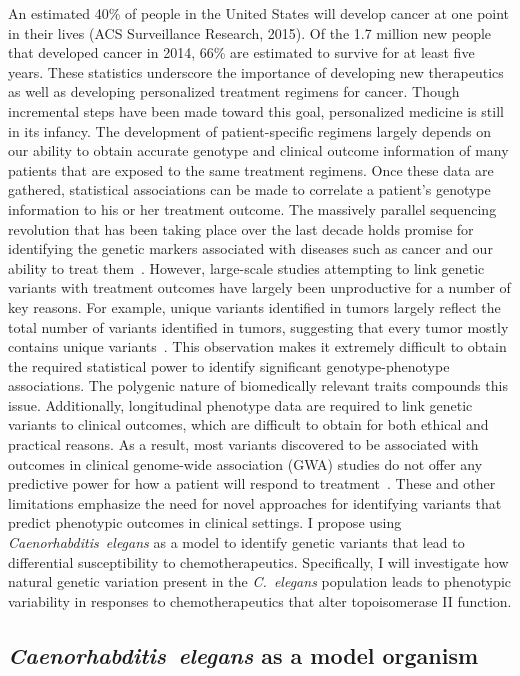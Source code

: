 \documentclass[12pt]{article}
\begin{document}
An estimated 40\% of people in the United States will develop cancer at one point in their lives (ACS Surveillance Research, 2015). Of the 1.7 million new people that developed cancer in 2014, 66\% are estimated to survive for at least five years. These statistics underscore the importance of developing new therapeutics as well as developing personalized treatment regimens for cancer. Though incremental steps have been made toward this goal, personalized medicine is still in its infancy. The development of patient-specific regimens largely depends on our ability to obtain accurate genotype and clinical outcome information of many patients that are exposed to the same treatment regimens. Once these data are gathered, statistical associations can be made to correlate a patient's genotype information to his or her treatment outcome. The massively parallel sequencing revolution that has been taking place over the last decade holds promise for identifying the genetic markers associated with diseases such as cancer and our ability to treat them~\cite{Koboldt:2013kw}. However, large-scale studies attempting to link genetic variants with treatment outcomes have largely been unproductive for a number of key reasons. For example, unique variants identified in tumors largely reflect the total number of variants identified in tumors, suggesting that every tumor mostly contains unique variants~\cite{Koboldt:2013kw}. This observation makes it extremely difficult to obtain the required statistical power to identify significant genotype-phenotype associations. The polygenic nature of biomedically relevant traits compounds this issue. Additionally, longitudinal phenotype data are required to link genetic variants to clinical outcomes, which are difficult to obtain for both ethical and practical reasons. As a result, most variants discovered to be associated with outcomes in clinical genome-wide association (GWA) studies do not offer any predictive power for how a patient will respond to treatment~\cite{Park:2012bz}. These and other limitations emphasize the need for novel approaches for identifying variants that predict phenotypic outcomes in clinical settings. I propose using {\it Caenorhabditis~elegans} as a model to identify genetic variants that lead to differential susceptibility to chemotherapeutics. Specifically, I will investigate how natural genetic variation present in the  {\it C.~elegans} population leads to phenotypic variability in responses to chemotherapeutics that alter topoisomerase II function. 
\vspace{-10pt}
\subsection{{\itshape Caenorhabditis~elegans} as a model organism}
\end{document}
